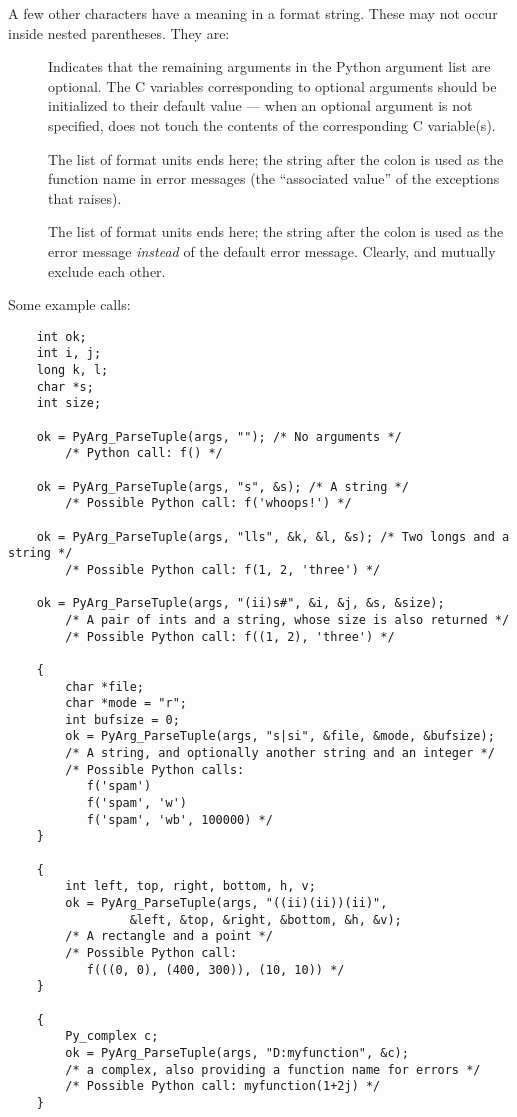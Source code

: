 \documentclass{manual}
\begin{document}
A few other characters have a meaning in a format string.  These may
not occur inside nested parentheses.  They are:

\begin{description}

\item[\samp{|}]
Indicates that the remaining arguments in the Python argument list are
optional.  The C variables corresponding to optional arguments should
be initialized to their default value --- when an optional argument is
not specified,  does not touch the contents
of the corresponding C variable(s).

\item[\samp{:}]
The list of format units ends here; the string after the colon is used
as the function name in error messages (the ``associated value'' of
the exceptions that  raises).

\item[\samp{;}]
The list of format units ends here; the string after the colon is used
as the error message \emph{instead} of the default error message.
Clearly, \samp{:} and \samp{;} mutually exclude each other.

\end{description}

Some example calls:

\begin{verbatim}
    int ok;
    int i, j;
    long k, l;
    char *s;
    int size;

    ok = PyArg_ParseTuple(args, ""); /* No arguments */
        /* Python call: f() */

    ok = PyArg_ParseTuple(args, "s", &s); /* A string */
        /* Possible Python call: f('whoops!') */

    ok = PyArg_ParseTuple(args, "lls", &k, &l, &s); /* Two longs and a string */
        /* Possible Python call: f(1, 2, 'three') */

    ok = PyArg_ParseTuple(args, "(ii)s#", &i, &j, &s, &size);
        /* A pair of ints and a string, whose size is also returned */
        /* Possible Python call: f((1, 2), 'three') */

    {
        char *file;
        char *mode = "r";
        int bufsize = 0;
        ok = PyArg_ParseTuple(args, "s|si", &file, &mode, &bufsize);
        /* A string, and optionally another string and an integer */
        /* Possible Python calls:
           f('spam')
           f('spam', 'w')
           f('spam', 'wb', 100000) */
    }

    {
        int left, top, right, bottom, h, v;
        ok = PyArg_ParseTuple(args, "((ii)(ii))(ii)",
                 &left, &top, &right, &bottom, &h, &v);
        /* A rectangle and a point */
        /* Possible Python call:
           f(((0, 0), (400, 300)), (10, 10)) */
    }

    {
        Py_complex c;
        ok = PyArg_ParseTuple(args, "D:myfunction", &c);
        /* a complex, also providing a function name for errors */
        /* Possible Python call: myfunction(1+2j) */
    }
\end{verbatim}
\end{document}
